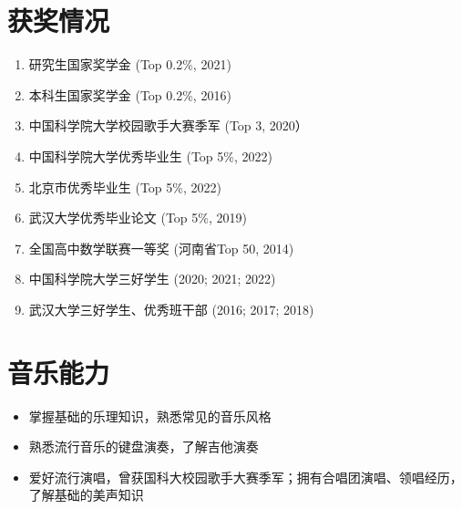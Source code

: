 \documentclass{resume}
\begin{document}
\section{获奖情况}
\begin{enumerate}
  \item 研究生国家奖学金 (Top 0.2\%, 2021)
  \item 本科生国家奖学金 (Top 0.2\%, 2016)
  \item 中国科学院大学校园歌手大赛季军 (Top 3, 2020）
  \item 中国科学院大学优秀毕业生 (Top 5\%, 2022)
  \item 北京市优秀毕业生 (Top 5\%, 2022)
  \item 武汉大学优秀毕业论文 (Top 5\%, 2019)
  \item 全国高中数学联赛一等奖 (河南省Top 50, 2014)
  \item 中国科学院大学三好学生 (2020; 2021; 2022)
  \item 武汉大学三好学生、优秀班干部 (2016; 2017; 2018)
\end{enumerate}

\section{音乐能力}
\begin{itemize}
  \item 掌握基础的乐理知识，熟悉常见的音乐风格
  \item 熟悉流行音乐的键盘演奏，了解吉他演奏
  \item 爱好流行演唱，曾获国科大校园歌手大赛季军；拥有合唱团演唱、领唱经历，了解基础的美声知识
\end{itemize}

\end{document}
